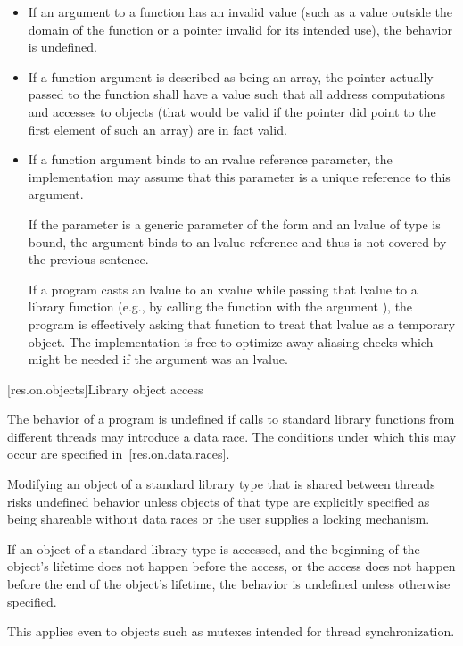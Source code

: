 \begin{itemize}
\item
If an argument to a function has an invalid value (such
%
as a value outside the domain of the function or a pointer invalid for its
intended use), the behavior is undefined.
%

\item
If a function argument is described as being an array,
%
the pointer actually passed to the function shall have a value such that all
address computations and accesses to objects (that would be valid if the
pointer did point to the first element of such an array) are in fact valid.

\item
If a function argument binds to an rvalue reference parameter, the implementation may
assume that this parameter is a unique reference to this argument.
\begin{note}
If the parameter is a generic parameter of the form  and an lvalue of type
 is bound, the argument binds to an lvalue reference
and thus is not covered by the previous sentence.
\end{note}
\begin{note}
If a program casts
an lvalue to an xvalue while passing that lvalue to a library function
(e.g., by calling the function with the argument ), the program
is effectively asking that function to treat that lvalue as a temporary object.
The implementation
is free to optimize away aliasing checks which might be needed if the argument was
an lvalue.
\end{note}
\end{itemize}

[res.on.objects]{Library object access}

\pnum
The behavior of a program is undefined if calls to standard library functions from different
threads may introduce a data race. The conditions under which this may occur are specified
in~\ref{res.on.data.races}. \begin{note} Modifying an object of a standard library type that is
shared between threads risks undefined behavior unless objects of that type are explicitly
specified as being shareable without data races or the user supplies a locking mechanism. \end{note}

\pnum
If an object of a standard library type is accessed, and
the beginning of the object's lifetime
does not happen before the access, or
the access does not happen before the end of the object's lifetime,
the behavior is undefined unless otherwise specified.
\begin{note}
This applies even to objects such as mutexes intended for thread synchronization.
\end{note}

